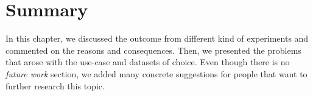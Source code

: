 \section{Summary}

In this chapter, we discussed the outcome from different kind of experiments and commented on the reasons and consequences. Then, we presented the problems that arose with the use-case and datasets of choice. Even though there is no \textit{future work} section, we added many concrete suggestions for people that want to further research this topic.
